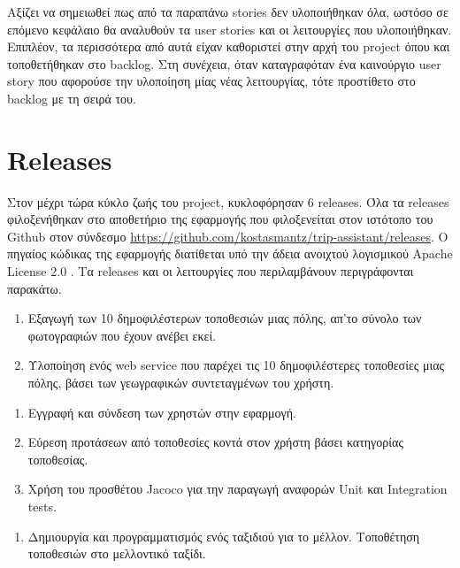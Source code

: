 \documentclass[oneside, 12pt]{book}
\begin{document}
\vspace{0.5cm}

Αξίζει να σημειωθεί πως από τα παραπάνω stories δεν υλοποιήθηκαν όλα, 
ωστόσο σε επόμενο κεφάλαιο θα αναλυθούν τα user stories και οι 
λειτουργίες που υλοποιήθηκαν.
Επιπλέον, τα περισσότερα από αυτά είχαν καθοριστεί στην αρχή του 
project όπου και τοποθετήθηκαν στο backlog.
Στη συνέχεια, όταν καταγραφόταν ένα καινούργιο user story που αφορούσε την υλοποίηση μίας νέας λειτουργίας, τότε προστίθετο στο backlog με τη σειρά του.
\section{Releases}
Στον μέχρι τώρα κύκλο ζωής του project, κυκλοφόρησαν 6 releases.
Όλα τα releases φιλοξενήθηκαν στο αποθετήριο της εφαρμογής που φιλοξενείται στον ιστότοπο του Github στον σύνδεσμο \url{https://github.com/kostasmantz/trip-assistant/releases}. 
Ο πηγαίος κώδικας της εφαρμογής διατίθεται υπό την άδεια ανοιχτού λογισμικού Apache License 2.0 .
Τα releases και οι λειτουργίες που περιλαμβάνουν περιγράφονται παρακάτω.

{\large \color{blue}{TripAssistant 0.1.0}}
\begin{enumerate}
    \item Εξαγωγή των 10 δημοφιλέστερων τοποθεσιών μιας πόλης, απ'το σύνολο των φωτογραφιών που έχουν ανέβει εκεί.
    \item Υλοποίηση ενός web service που παρέχει τις 10 δημοφιλέστερες τοποθεσίες μιας πόλης, βάσει των γεωγραφικών συντεταγμένων του χρήστη.
\end{enumerate}

{\large \color{blue}{TripAssistant 0.2.0}}
\begin{enumerate}
    \item Εγγραφή και σύνδεση των χρηστών στην εφαρμογή.
    \item Εύρεση προτάσεων από τοποθεσίες κοντά στον χρήστη βάσει κατηγορίας τοποθεσίας.
    \item Χρήση του προσθέτου Jacoco για την παραγωγή αναφορών Unit και Integration tests.
\end{enumerate}

{\large \color{blue}{TripAssistant 0.3.0}}
\begin{enumerate}
    \item Δημιουργία και προγραμματισμός ενός ταξιδιού για το μέλλον.
    Τοποθέτηση τοποθεσιών στο μελλοντικό ταξίδι.
\end{enumerate}
\end{document}
